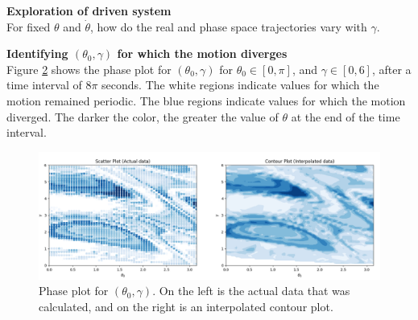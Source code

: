 \begin{problem}{4}
	\textbf{Exploration of driven system} \\
	For fixed $\theta$ and $\dot{\theta}$, how do the real and phase space trajectories vary with $\gamma$.  

	\begin{figure}[ht!]
	\centering
	\begin{minipage}[b]{0.4\textwidth}
	\end{minipage}
	\hfill
	\begin{minipage}[b]{0.4\textwidth}
	\end{minipage}
	\caption{}
	\label{diving2}
\end{figure}
\end{problem}

\begin{problem}{5}
	\textbf{Identifying $(\theta_{0},\gamma)$ for which the motion diverges} \\

	Figure \ref{diverge} shows the phase plot for $(\theta_{0},\gamma)$ for $\theta_{0} \in [0,\pi]$, and $\gamma \in [0,6]$, after a time interval of $8\pi$ seconds.  The white regions indicate values for which the motion remained periodic. The blue regions indicate values for which the motion diverged.  The darker the color, the greater the value of $\theta$ at the end of the time interval.
\begin{figure}[h!]
	\centering
  	\includegraphics[scale=0.5]{../figures/diverge2.png}
 	\caption{Phase plot for $(\theta_{0},\gamma)$. On the left is the actual data that was calculated, and on the right is an interpolated contour plot.}
  	\label{diverge}
\end{figure}
\end{problem}

